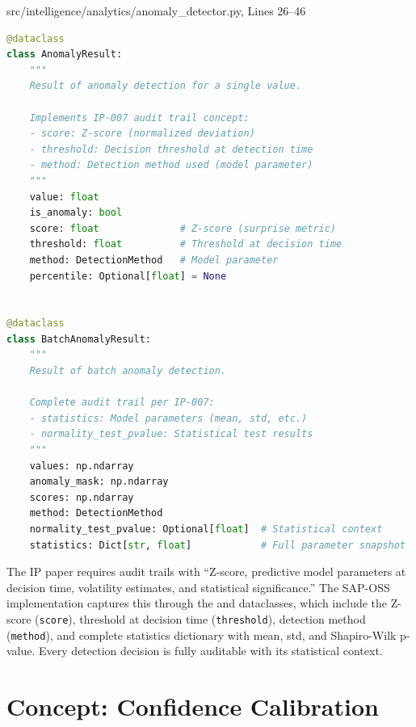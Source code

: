 \begin{implbox}{src/intelligence/analytics/anomaly\_detector.py, Lines 26--46}
\begin{lstlisting}[language=Python]
@dataclass
class AnomalyResult:
    """
    Result of anomaly detection for a single value.
    
    Implements IP-007 audit trail concept:
    - score: Z-score (normalized deviation)
    - threshold: Decision threshold at detection time
    - method: Detection method used (model parameter)
    """
    value: float
    is_anomaly: bool
    score: float              # Z-score (surprise metric)
    threshold: float          # Threshold at decision time
    method: DetectionMethod   # Model parameter
    percentile: Optional[float] = None


@dataclass
class BatchAnomalyResult:
    """
    Result of batch anomaly detection.
    
    Complete audit trail per IP-007:
    - statistics: Model parameters (mean, std, etc.)
    - normality_test_pvalue: Statistical test results
    """
    values: np.ndarray
    anomaly_mask: np.ndarray
    scores: np.ndarray
    method: DetectionMethod
    normality_test_pvalue: Optional[float]  # Statistical context
    statistics: Dict[str, float]            # Full parameter snapshot
\end{lstlisting}
\end{implbox}

\begin{adaptbox}
The IP paper requires audit trails with ``Z-score, predictive model parameters at decision time, volatility estimates, and statistical significance.'' The SAP-OSS implementation captures this through the  and  dataclasses, which include the Z-score (\texttt{score}), threshold at decision time (\texttt{threshold}), detection method (\texttt{method}), and complete statistics dictionary with mean, std, and Shapiro-Wilk p-value. Every detection decision is fully auditable with its statistical context.
\end{adaptbox}

\section{Concept: Confidence Calibration}
\label{sec:ip007-confidence}

